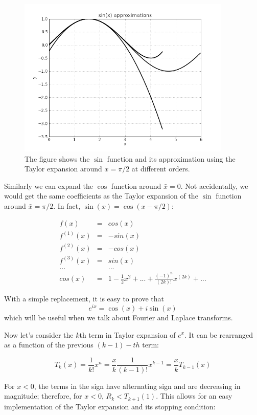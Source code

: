 \documentclass[justified,sixbynine]{tufte-book}
\theoremstyle{plain}%
\theoremstyle{definition}
\theoremstyle{remark}
\begin{document}
\begin{fullwidth}
\begin{figure}[ht]
\centering\includegraphics[width=4in]{images/sin2.png}
\caption{The figure shows the $\sin$ function and its approximation using the Taylor expansion around $x=\pi/2$ at different orders.}
\end{figure}

Similarly we can expand the $\cos$ function around $\bar x = 0$. Not accidentally, we would get the same coefficients as the Taylor expansion of the $\sin$ function around $\bar x = \pi/2$. In fact, $\sin(x) = \cos(x-\pi/2)$:

\begin{eqnarray}
f(x) &=& cos(x) \\
f^{(1)}(x) &=& -sin(x) \\
f^{(2)}(x) &=& -cos(x) \\
f^{(3)}(x) &=& sin(x) \\
... && ... \\
cos(x) &=&  1 - \frac1{2}x^2 + ... + \frac{(-1)^n}{(2k)!}x^{(2k)} + ...
\end{eqnarray}

With a simple replacement, it is easy to prove that
\begin{equation}
e^{ix} = \cos(x) + i \sin(x)
\end{equation}
which will be useful when we talk about Fourier and Laplace transforms.

Now let's consider the $k$th term in Taylor expansion of $e^x$. It can be rearranged as a function of the previous $(k-1)-th$ term:

\begin{equation}
T_k(x) = \frac1{k!}x^n = \frac{x}{k} \frac1{(k-1)!}x^{k-1} = \frac{x}{k} T_{k-1}(x)
\end{equation}

For $x<0$, the terms in the sign have alternating sign and are decreasing in magnitude; therefore, for $x<0$, $R_k<T_{k+1}(1)$. This allows for an easy implementation of the Taylor expansion and its stopping condition:


\end{fullwidth}
\end{document}
